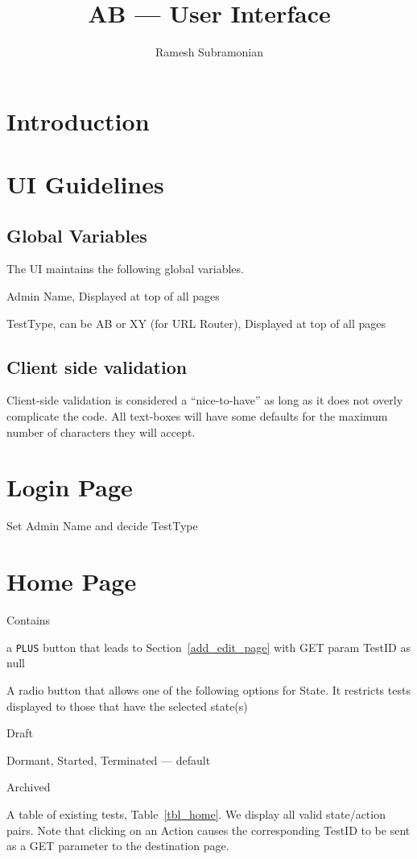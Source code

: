 \documentclass[letterpaper]{article}
\begin{document}
\title{AB --- User Interface}
\author{ Ramesh Subramonian }
\maketitle
\thispagestyle{fancy}
\lhead{}
\chead{}
\rhead{}
\cfoot{}
\rfoot{{\small \thepage}}

\section{Introduction}

\section{UI Guidelines}
\subsection{Global Variables}
The UI maintains the following global variables. 
\be
\item Admin Name, Displayed at top of all pages
\item TestType, can be AB or XY (for URL Router), 
  Displayed at top of all pages
\ee

\subsection{Client side validation}
Client-side validation is considered a ``nice-to-have'' as long as it does not
overly complicate the code. All text-boxes will have some defaults for the
maximum number of characters they will accept.

\section{Login Page}

Set Admin Name and decide TestType

\section{Home Page}
\label{home_page}
Contains 
\be
\item a {\tt PLUS} button that leads to Section~\ref{add_edit_page} 
  with GET param TestID as null
\item A radio button that allows one of the following options for State. 
  It restricts tests displayed to those that have the selected state(s)
  \be
\item Draft
\item Dormant, Started, Terminated --- default 
\item Archived
  \ee
\item A table of existing tests, Table~\ref{tbl_home}. We display all valid
  state/action pairs. Note that clicking on an Action causes the corresponding
  TestID to be sent as a GET parameter to the destination page.
\ee
\end{document}
